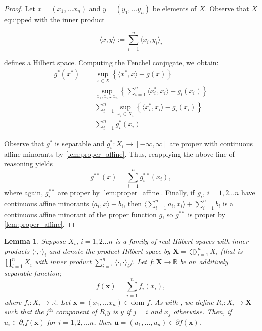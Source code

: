 \documentclass[11pt]{article}
\newtheorem{lemma}{Lemma}
\newcommand\inner[2]{\langle #1, #2 \rangle}
\newcommand{\R}{\mathbb{R}}
\begin{document}
	\begin{proof}
		Let $x = (x_1, \ldots x_n)$ and $y = (y_1, \ldots y_n)$ be elements of $X$. Observe that $X$ equipped with the inner product 
		
		\[	\langle x, y\rangle := \sum_{i=1}^{n} \langle x_{i}, y_{i}\rangle_{i}
				\]
				
		\noindent defines a Hilbert space. 	Computing the Fenchel conjugate, we obtain:
		\begin{align*}
			g^{*}(x^{*}) 
			& = \sup_{x\in X}\left\{ 
									\langle x^*, x\rangle - g(x)
												\right\} \\
			& = \sup_{x_1,x_2\ldots x_n} \left\{
										\sum_{i=1}^{n} \langle x^{*}_{i}, x_i\rangle - g_{i}(x_i)
												\right\}	\\
			& = \sum_{i=1}^{n}	\sup_{x_i\in X_i} \left\{\langle x^{*}_{i}, x_i\rangle - g_{i}(x_i)\right\} \\
			& = \sum_{i=1}^{n} g_{i}^{*}(x_i)					
			\end{align*}
			
			\noindent Observe that $g^{*}$ is separable and $g_{i}^{*}:X_{i}\to[-\infty, \infty]$ are proper with continuous affine minorants by \autoref{lem:proper_affine}. Thus, reapplying the above line of reasoning yields 
			\[	g^{**}(x) = \sum_{i=1}^{n} g_{i}^{**}(x_i),
			\]
			where again, $g^{**}_{i}$ are proper by \autoref{lem:proper_affine}. Finally, if $g_{i}$, $i=1,2\ldots n$ have continuous affine minorants $\langle a_{i}, x\rangle + b_{i}$, then $\langle \sum_{i=1}^{n}a_i, x_i\rangle + \sum_{i=1}^{n} b_{i}$ is a continuous affine minorant of the proper function $g$, so $g^{**}$ is proper by \autoref{lem:proper_affine}.
		\end{proof}
		\begin{lemma}
			 Suppose $X_i$, $i=1,2\ldots n$ is a family of real Hilbert spaces with inner products $\inner{\cdot}{\cdot}_i$ and denote the product Hilbert space by $\bm{X}=\bigoplus_{i=1}^{n}X_i$ (that is $\prod_{i=1}^{n}X_i$ with inner product $\sum_{i=1}^{n}\inner{\cdot}{\cdot}_i$). Let $f:\bm{X}\to\R$ be an additively separable function;
			\[  f(\bm{x}) = \sum_{i=1}^{n}f_{i}(x_i),
			\]
			where $f_i:X_i\to\R$. Let $\bm{x}=(x_1, \ldots x_n)\in\text{dom }f$. As with \cite{Bauschke2010}, we define $R_i:X_i\to \bm{X}$ such that the j$^{\text{th}}$ component of $R_i y$ is $y$ if $j=i$ and $x_j$ otherwise. Then, if $u_i\in\partial_i f(\bm{x})$ for $i=1,2,\ldots n$, then $\bm{u}=(u_1, \ldots, u_n)\in\partial f(\bm{x})$.
			\end{lemma}
\end{document}
